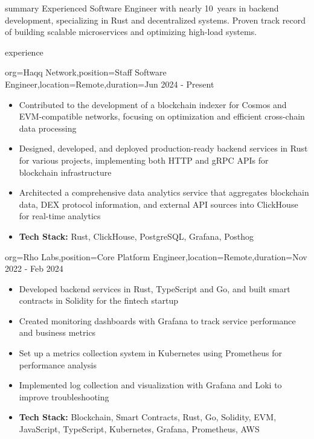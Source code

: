 \documentclass{resume}
\begin{document}
\makeheader

\begin{ResumeSection}{summary}
    Experienced Software Engineer with nearly 10~years in backend development, specializing in Rust and decentralized systems. Proven track record of building scalable microservices and optimizing high-load systems.
\end{ResumeSection}

\begin{ResumeSection}{experience}
\begin{ResumeSubsection}{org=Haqq Network,position=Staff Software Engineer,location=Remote,duration=Jun 2024 - Present}
        \begin{itemize}
            \item Contributed to the development of a blockchain indexer for Cosmos and EVM-compatible networks, focusing on optimization and efficient cross-chain data processing
            \item Designed, developed, and deployed production-ready backend services in Rust for various projects, implementing both HTTP and gRPC APIs for blockchain infrastructure
            \item Architected a comprehensive data analytics service that aggregates blockchain data, DEX protocol information, and external API sources into ClickHouse for real-time analytics
            \item \textbf{Tech Stack:} Rust, ClickHouse, PostgreSQL, Grafana, Posthog
        \end{itemize}
    \end{ResumeSubsection}

    \begin{ResumeSubsection}{org=Rho Labs,position=Core Platform Engineer,location=Remote,duration=Nov 2022 - Feb 2024}
    \begin{itemize}
        \item Developed backend services in Rust, TypeScript and Go, and built smart contracts in Solidity for the fintech startup
        \item Created monitoring dashboards with Grafana to track service performance and business metrics
        \item Set up a metrics collection system in Kubernetes using Prometheus for performance analysis
        \item Implemented log collection and visualization with Grafana and Loki to improve troubleshooting
        \item \textbf{Tech Stack:} Blockchain, Smart Contracts, Rust, Go, Solidity, EVM, JavaScript, TypeScript, Kubernetes, Grafana, Prometheus, AWS
    \end{itemize}
\end{ResumeSubsection}


\end{ResumeSection}
\end{document}
